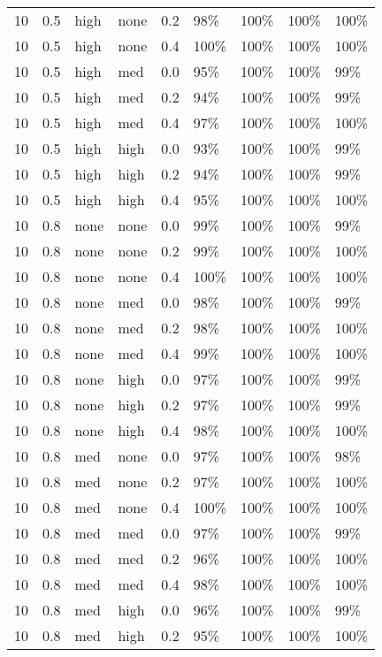 \begin{longtable}{rrllrllll}
  10 & 0.5 & high & none & 0.2 & 98\% & 100\% & 100\% & 100\% \\ 
  10 & 0.5 & high & none & 0.4 & 100\% & 100\% & 100\% & 100\% \\ 
  10 & 0.5 & high & med & 0.0 & 95\% & 100\% & 100\% & 99\% \\ 
  10 & 0.5 & high & med & 0.2 & 94\% & 100\% & 100\% & 99\% \\ 
  10 & 0.5 & high & med & 0.4 & 97\% & 100\% & 100\% & 100\% \\ 
  10 & 0.5 & high & high & 0.0 & 93\% & 100\% & 100\% & 99\% \\ 
  10 & 0.5 & high & high & 0.2 & 94\% & 100\% & 100\% & 99\% \\ 
  10 & 0.5 & high & high & 0.4 & 95\% & 100\% & 100\% & 100\% \\ 
  10 & 0.8 & none & none & 0.0 & 99\% & 100\% & 100\% & 99\% \\ 
  10 & 0.8 & none & none & 0.2 & 99\% & 100\% & 100\% & 100\% \\ 
  10 & 0.8 & none & none & 0.4 & 100\% & 100\% & 100\% & 100\% \\ 
  10 & 0.8 & none & med & 0.0 & 98\% & 100\% & 100\% & 99\% \\ 
  10 & 0.8 & none & med & 0.2 & 98\% & 100\% & 100\% & 100\% \\ 
  10 & 0.8 & none & med & 0.4 & 99\% & 100\% & 100\% & 100\% \\ 
  10 & 0.8 & none & high & 0.0 & 97\% & 100\% & 100\% & 99\% \\ 
  10 & 0.8 & none & high & 0.2 & 97\% & 100\% & 100\% & 99\% \\ 
  10 & 0.8 & none & high & 0.4 & 98\% & 100\% & 100\% & 100\% \\ 
  10 & 0.8 & med & none & 0.0 & 97\% & 100\% & 100\% & 98\% \\ 
  10 & 0.8 & med & none & 0.2 & 97\% & 100\% & 100\% & 100\% \\ 
  10 & 0.8 & med & none & 0.4 & 100\% & 100\% & 100\% & 100\% \\ 
  10 & 0.8 & med & med & 0.0 & 97\% & 100\% & 100\% & 99\% \\ 
  10 & 0.8 & med & med & 0.2 & 96\% & 100\% & 100\% & 100\% \\ 
  10 & 0.8 & med & med & 0.4 & 98\% & 100\% & 100\% & 100\% \\ 
  10 & 0.8 & med & high & 0.0 & 96\% & 100\% & 100\% & 99\% \\ 
  10 & 0.8 & med & high & 0.2 & 95\% & 100\% & 100\% & 100\% \\ 

\end{longtable}
